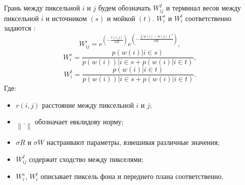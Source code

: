 Грань между пиксельной $i$ и $j$ будем обозначать $W^I_{ij}$ и терминал весов между пиксельной $i$ и источником $\left(s\right)$ и мойкой $\left(t\right)$. $W^s_i$ и $W^t_i$ соответственно задаются \cite{Parvathy}:
\begin{equation}\label{eq22}
W^i_{ij} = e^{\left(-\frac{r\left(i,j\right)}{\sigma R}\right)}e^{\left(-\frac{\left\|w\left(i\right)-w\left(j\right)\right\|^2}{\sigma W}\right)},
\end{equation}
\begin{equation}\label{eq23}
W^s_i = \frac{p\left(w\left(i\right)| i \in s\right)}{p \left(w \left(i\right)\right)|i \in s + p \left(w\left(i\right)|i \in t\right)},
\end{equation}
\begin{equation}\label{eq24}
W^t_i = \frac{p\left(w\left(i\right) | i \in t\right)}{p \left(w \left(i\right)\right)|i \in s + p \left(w\left(i\right)|i \in t\right)}.
\end{equation}
Где:

\begin{itemize}
	\item $r\left(i,j\right)$ расстояние между пиксельной $i$ и $j$;
	\item $\left\|.\right\|$ обозначает евклидову норму;
	\item $\sigma R$ и $\sigma W$ настраивают параметры, взвешивая различные значения;
	\item $W^I_{ij}$ содержит сходство между пикселями;
	\item $W^s_i$, $W^t_i$ описывает пиксель фона и переднего плана соответственно.
\end{itemize}



